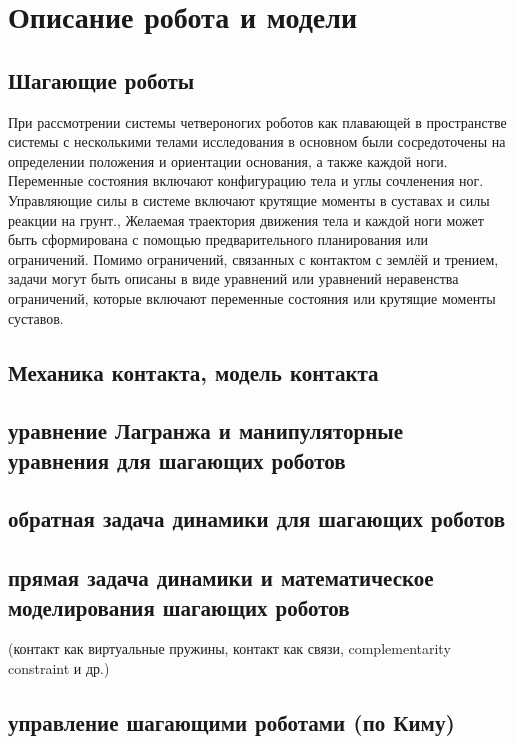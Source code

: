 \chapter{Описание робота и модели}\label{ch:ch2}
\section{Шагающие роботы}\label{sec:ch2/sec1}
При рассмотрении системы четвероногих роботов как плавающей в пространстве системы с несколькими телами исследования в основном были сосредоточены на определении положения и ориентации основания, а также каждой ноги. Переменные состояния включают конфигурацию тела и углы сочленения ног. Управляющие силы в системе включают крутящие моменты в суставах и силы реакции на грунт.\cite{henze2016}, \cite{farshidian2017robust} Желаемая траектория движения тела и каждой ноги может быть сформирована с помощью предварительного планирования или ограничений. Помимо ограничений, связанных с контактом с землёй и трением,\cite{henze2017multi} задачи могут быть описаны в виде уравнений или уравнений неравенства ограничений, которые включают переменные состояния или крутящие моменты суставов. 

\section{Механика контакта, модель контакта}\label{sec:ch2/sect2}
\section{уравнение Лагранжа и манипуляторные уравнения для шагающих роботов}\label{sec:ch2/sect3}
\section{обратная задача динамики для шагающих роботов}\label{sec:ch2/sect4}
\section{прямая задача динамики и математическое моделирования шагающих роботов}\label{sec:ch2/sect5}
(контакт как виртуальные пружины, контакт как связи, complementarity constraint и др.)
\section{управление шагающими роботами (по Киму)}\label{sec:ch2/sect6}
\FloatBarrier
